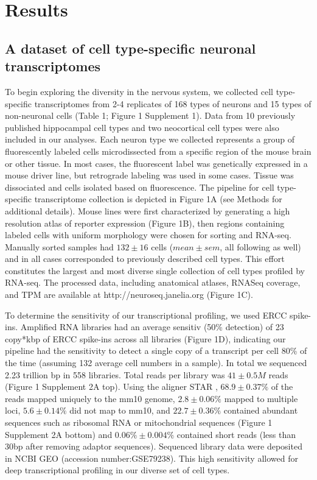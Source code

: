 \section{Results}

\subsection{A dataset of cell type-specific neuronal transcriptomes}
To begin exploring the diversity in the nervous system, we collected cell type-specific transcriptomes from 2-4 replicates of 168 types of neurons and 15 types of non-neuronal cells (Table 1; Figure 1 Supplement 1). Data from 10 previously published hippocampal cell types \citep{Cembrowski_2016} and two neocortical cell types \citep{Shima_2016} were also included in our analyses. Each neuron type we collected represents a group of fluorescently labeled cells microdissected from a specific region of the mouse brain or other tissue. In most cases, the fluorescent label was genetically expressed in a mouse driver line, but retrograde labeling was used in some cases. Tissue was dissociated and cells isolated based on fluorescence. The pipeline for cell type-specific transcriptome collection is depicted in Figure 1A (see Methods for additional details). Mouse lines were first characterized by generating a high resolution atlas of reporter expression (Figure 1B), then regions containing labeled cells with uniform morphology were chosen for sorting and RNA-seq. Manually sorted samples had $132\pm16$ cells ($mean\pm sem$, all following as well) and in all cases corresponded to previously described cell types. This effort constitutes the largest and most diverse single collection of cell types profiled by RNA-seq. The processed data, including anatomical atlases, RNASeq coverage, and TPM are available at http://neuroseq.janelia.org (Figure 1C). 

To determine the sensitivity of our transcriptional profiling, we used ERCC spike-ins. Amplified RNA libraries had an average sensitiv (50\% detection) of 23 copy*kbp of ERCC spike-ins across all libraries (Figure 1D), indicating our pipeline had the sensitivity to detect a single copy of a transcript per cell 80\% of the time (assuming 132 average cell numbers in a sample). In total we sequenced 2.23 trillion bp in 558 libraries. Total reads per library was $41\pm0.5M$ reads (Figure 1 Supplement 2A top). Using the aligner STAR \citep{Dobin_2012}, $68.9\pm0.37\%$ of the reads mapped uniquely to the mm10 genome, $2.8\pm0.06\%$ mapped to multiple loci, $5.6\pm0.14\%$ did not map to mm10, and $22.7\pm0.36\%$ contained abundant sequences such as ribosomal RNA or mitochondrial sequences (Figure 1 Supplement 2A bottom) and $0.06\%\pm 0.004\%$ contained short reads (less than 30bp after removing adaptor sequences). Sequenced library data were deposited in NCBI GEO (accession number:GSE79238). This high sensitivity allowed for deep transcriptional profiling in our diverse set of cell types.

